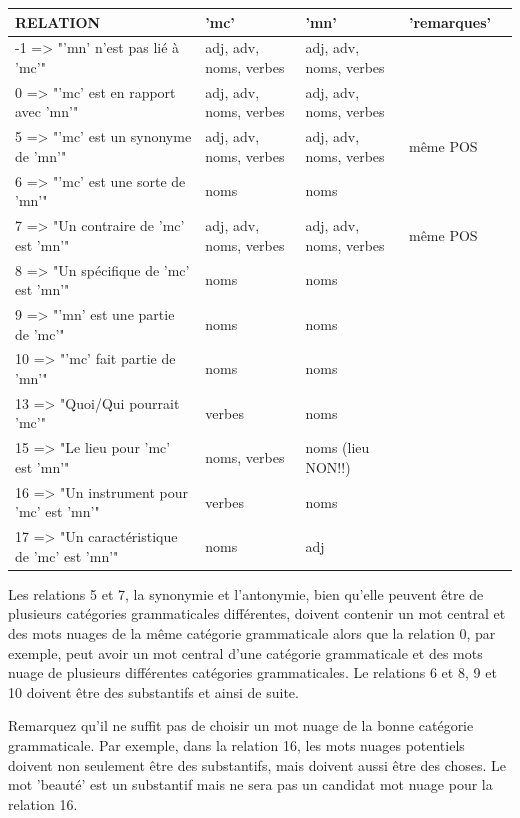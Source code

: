 \documentclass[a4paper,11pt,french]{article}
\begin{document}
\begin{center}
        \begin{tabular}{ | l | l | l | l | p{5cm} |}
        \hline
RELATION &	'mc' & 'mn'	& 'remarques' \\ \hline
-1 => "'mn' n'est pas lié à 'mc'" &	adj, adv, noms, verbes & adj, adv, noms, verbes	& \\ \hline
0 =>  "'mc' est en rapport avec 'mn'" & adj, adv, noms, verbes & adj, adv, noms, verbes & \\ \hline
5 => "'mc' est un synonyme de 'mn'" & adj, adv, noms, verbes & adj, adv, noms, verbes & même POS \\ \hline
6 => "'mc' est une sorte de 'mn'" & noms & noms & \\ \hline
7 => "Un contraire de 'mc' est 'mn'" & adj, adv, noms, verbes &	adj, adv, noms, verbes & même POS \\ \hline
8 => "Un spécifique de 'mc' est 'mn'" & noms & noms & \\ \hline
9 => "'mn' est une partie de 'mc'" & noms & noms & \\ \hline
10 => "'mc' fait partie de 'mn'" & noms & noms & \\ \hline
13 => "Quoi/Qui pourrait 'mc'" & verbes & noms & \\ \hline
15 => "Le lieu pour 'mc' est 'mn'" & noms, verbes & noms (lieu NON!!) & \\ \hline
16 => "Un instrument pour 'mc' est 'mn'" & verbes & noms & \\ \hline
17 => "Un caractéristique de 'mc' est 'mn'" & noms & adj & \\ \hline
        \end{tabular}
\end{center}

Les relations 5 et 7, la synonymie et l'antonymie, bien qu'elle peuvent être de plusieurs catégories grammaticales différentes, doivent contenir un mot central et des mots nuages de la même catégorie grammaticale alors que la relation 0, par exemple, peut avoir un mot central d'une catégorie grammaticale et des mots nuage de plusieurs différentes catégories grammaticales. Le relations 6 et 8, 9 et 10 doivent être des substantifs et ainsi de suite.

Remarquez qu'il ne suffit pas de choisir un mot nuage de la bonne catégorie grammaticale. Par exemple, dans la relation 16, les mots nuages potentiels doivent non seulement être des substantifs, mais doivent aussi être des choses. Le mot 'beauté' est un substantif mais ne sera pas un candidat mot nuage pour la relation 16. 
\end{document}
